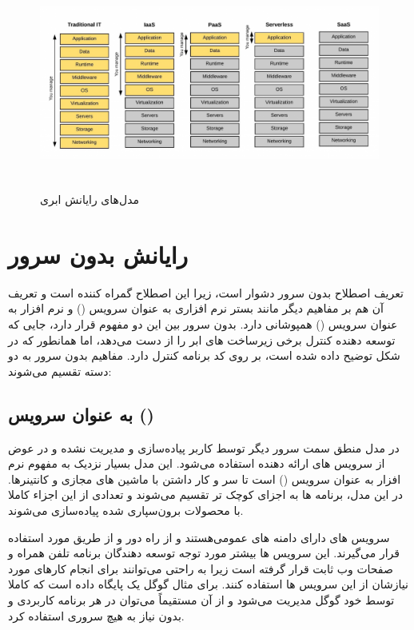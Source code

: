 \begin{figure}[!h]
	\centering
	\includegraphics[height=7cm]{images/cloud-computing-service-models}
	\caption{مدل‌های رایانش ابری}
	\label{تصویر 2-1}
\end{figure}

\section{رایانش بدون سرور}

تعریف اصطلاح بدون سرور دشوار است، زیرا این اصطلاح گمراه کننده است و تعریف آن هم بر مفاهیم دیگر مانند بستر نرم افزاری به عنوان سرویس () و نرم افزار به عنوان سرویس () همپوشانی دارد. بدون سرور بین این دو مفهوم قرار دارد، جایی که توسعه دهنده کنترل برخی زیرساخت های ابر را از دست می‌دهد، اما همانطور که در شکل  توضیح داده شده است، بر روی کد برنامه کنترل دارد. مفاهیم بدون سرور به دو دسته تقسیم می‌شوند:

\subsection{ به عنوان سرویس ()}

در مدل  منطق سمت سرور دیگر توسط کاربر پیاده‌سازی و مدیریت نشده و در عوض از سرویس های ارائه دهنده استفاده می‌شود. این مدل بسیار نزدیک به مفهوم نرم افزار به عنوان سرویس () است تا سر و کار داشتن با ماشین های مجازی و کانتینرها. در این مدل، برنامه ها به اجزای کوچک تر تقسیم می‌شوند و تعدادی از این اجزاء کاملا با محصولات برون‌سپاری شده پیاده‌سازی می‌شوند.

سرویس های  دارای دامنه های عمومی‌هستند و از راه دور و از طریق  مورد استفاده قرار می‌گیرند. این سرویس ها بیشتر مورد توجه توسعه دهندگان برنامه تلفن همراه و صفحات وب ثابت قرار گرفته است زیرا به راحتی می‌توانند برای انجام کارهای مورد نیازشان از این سرویس ها استفاده کنند. برای مثال  گوگل یک پایگاه داده است که کاملا توسط خود گوگل مدیریت می‌شود و از آن مستقیماً می‌توان در هر برنامه کاربردی و بدون نیاز به هیچ سروری استفاده کرد.

